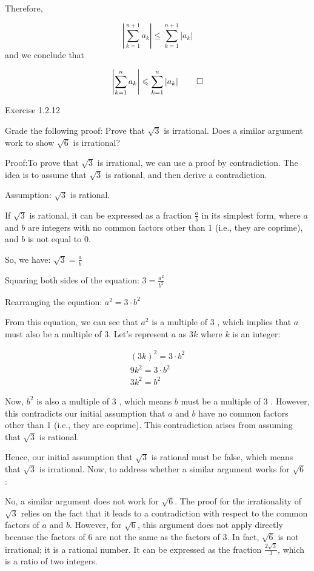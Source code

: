 \documentclass{report}
\begin{document}
Therefore,

$$
\left|\sum_{k=1}^{n+1} a_{k}\right| \leq \sum_{k=1}^{n+1}\left|a_{k}\right| $$  and we conclude that

$$
\left|\sum_{k=1}^{n} a_{k}\right| \leq \sum_{k=1}^{n}\left|a_{k}\right| \qed$$

\bigskip
{}



\qs{}
{Exercise 1.2.12}

\qs{}
{Grade the following proof: Prove that $\sqrt{3}$ is irrational. Does a similar argument work to show $\sqrt{6}$ is irrational?}

Proof:To prove that $\sqrt{3}$ is irrational, we can use a proof by contradiction. The idea is to assume that $\sqrt{3}$ is rational, and then derive a contradiction.

Assumption: $\sqrt{3}$ is rational.

If $\sqrt{3}$ is rational, it can be expressed as a fraction $\frac{a}{b}$ in its simplest form, where $a$ and $b$ are integers with no common factors other than 1 (i.e., they are coprime), and $b$ is not equal to 0.

So, we have: $\sqrt{3}=\frac{a}{b}$

Squaring both sides of the equation: $3=\frac{a^{2}}{b^{2}}$

Rearranging the equation: $a^{2}=3 \cdot b^{2}$

From this equation, we can see that $a^{2}$ is a multiple of 3 , which implies that $a$ must also be a multiple of 3. Let's represent $a$ as $3 k$ where $k$ is an integer:

$$
\begin{gathered}
(3 k)^{2}=3 \cdot b^{2} \\
9 k^{2}=3 \cdot b^{2} \\
3 k^{2}=b^{2}
\end{gathered}
$$

Now, $b^{2}$ is also a multiple of 3 , which means $b$ must be a multiple of 3 . However, this contradicts our initial assumption that $a$ and $b$ have no common factors other than 1 (i.e., they are coprime). This contradiction arises from assuming that $\sqrt{3}$ is rational.

Hence, our initial assumption that $\sqrt{3}$ is rational must be false, which means that $\sqrt{3}$ is irrational. Now, to address whether a similar argument works for $\sqrt{6}$ :

No, a similar argument does not work for $\sqrt{6}$. The proof for the irrationality of $\sqrt{3}$ relies on the fact that it leads to a contradiction with respect to the common factors of $a$ and $b$. However, for $\sqrt{6}$, this argument does not apply directly because the factors of 6 are not the same as the factors of 3. In fact, $\sqrt{6}$ is not irrational; it is a rational number. It can be expressed as the fraction $\frac{2 \sqrt{3}}{3}$, which is a ratio of two integers.
\end{document}

